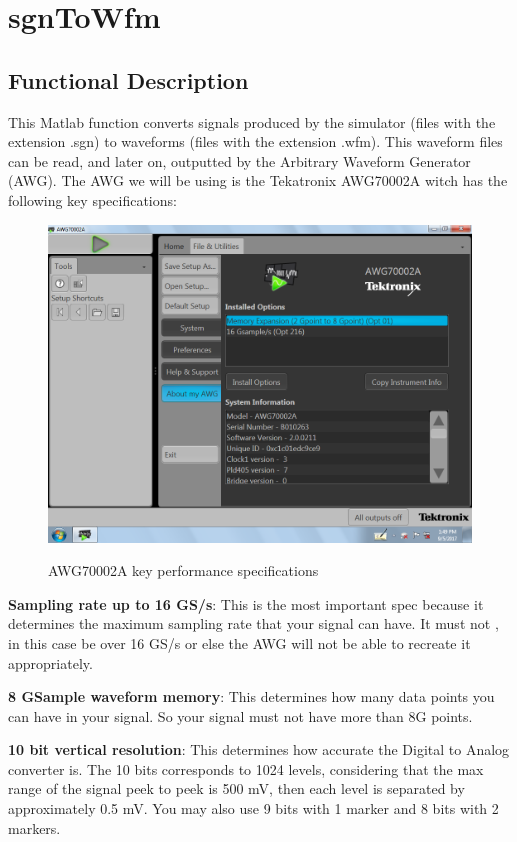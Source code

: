 \clearpage

\section{sgnToWfm}


\subsection*{Functional Description}

This Matlab function converts signals produced by the simulator (files with the extension .sgn) to waveforms  (files with the extension .wfm). This waveform files can be read, and later on, outputted by the Arbitrary Waveform Generator (AWG).
The AWG we will be using is the Tekatronix AWG70002A witch has the following key specifications:
\begin{figure}[h]
	\centering
	\includegraphics[width=\textwidth]{../mtools/sgnToWfm/figures/specs}
	\label{TUT_CompBad}\caption{AWG70002A key performance specifications}
\end{figure}
\bigskip

\textbf{Sampling rate up to 16 GS/s}: This is the most important spec because it determines the maximum sampling rate that your signal can have. It must not , in this case be over 16 GS/s or else the AWG will not be able to recreate it appropriately.

\textbf{8 GSample waveform memory}: This determines how many data points you can have in your signal. So your signal must not have more than 8G points.
\bigskip

\textbf{10 bit vertical resolution}: This determines how accurate the Digital to Analog converter is. The 10 bits corresponds to 1024 levels, considering that the max range of the signal peek to peek is 500 mV, then each level is separated by approximately 0.5 mV. You may also use 9 bits with 1 marker and 8 bits with 2 markers.
\bigskip




